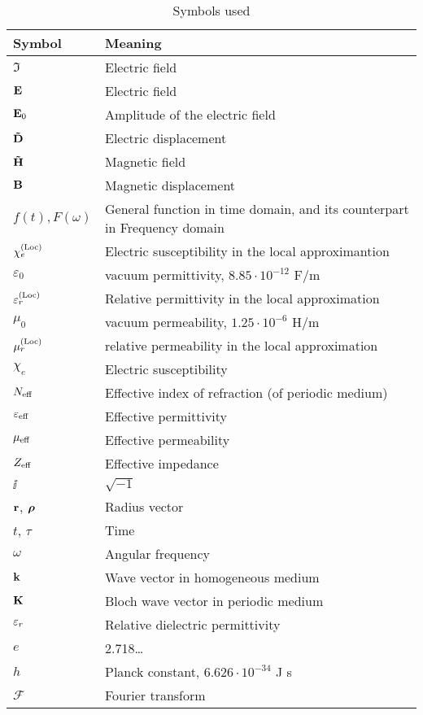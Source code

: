 \begin{table}[ht]   \caption{Symbols used}  \label{tb_symbols} \centering %
\begin{tabular}{ll}
 \toprule
Symbol & Meaning	\\
 \hline
$\Im$ 		& Electric field\\
$\mathbf{E}$ 		& Electric field\\
$\mathbf{E}_0$ 		& Amplitude of the electric field\\
$\mathbf{\tilde{D}}$ 		& Electric displacement\\
$\mathbf{\tilde{H}}$ 		& Magnetic field\\
$\mathbf{B}$ 		& Magnetic displacement\\
$f(t), F(\omega)$ & General function in time domain, and its counterpart in Frequency domain \\
$\chi_e^{\rm(Loc)}$ & Electric susceptibility in the local approximantion \\
$\varepsilon_0$ &vacuum permittivity, $8.85\cdot10^{-12}$ F/m\\
$\varepsilon^{\rm(Loc)}_r$ &Relative permittivity in the local approximation\\
$\mu_0$		&vacuum permeability, $1.25\cdot10^{-6}$ H/m \\
$\mu^{\rm(Loc)}_r$ &relative permeability in the local approximation\\
$\chi_e$ 	& Electric susceptibility\\
$N_{\text{eff} }$ 	& Effective index of refraction (of periodic medium)\\
$\varepsilon_{\text{eff} }$ 	& Effective permittivity\\
$\mu_{\text{eff} }$ 	& Effective permeability\\
$Z_{\text{eff} }$ 	& Effective impedance\\
$\ii$		& $\sqrt{-1}$\\
${\mathbf{r}}$, $\boldsymbol{\rho}$ 		& Radius vector\\
$t$, $\tau$ 		& Time\\
$\omega$ 	& Angular frequency\\
${\mathbf{k}}$ 		& Wave vector in homogeneous medium\\
${\mathbf{K}}$ 		& Bloch wave vector in periodic medium\\
${\varepsilon_r}$ 	& Relative dielectric permittivity\\
$e$ 		& 2.718\ldots\\
$h$ 		& Planck constant, $6.626\cdot 10^{-34}$ J s\\
$\mathcal F$ 		& Fourier transform\\
 \bottomrule
 \end{tabular} \end{table}

